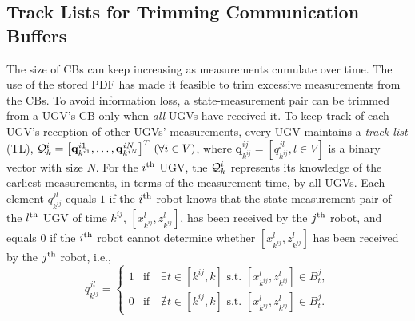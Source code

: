 	
	
	\subsection{Track Lists for Trimming Communication Buffers}\label{subsec:tracklist}
	The size of CBs can keep increasing as measurements cumulate over time. 
	The use of the stored PDF has made it feasible to trim excessive measurements from the CBs.
	To avoid information loss, a state-measurement pair can be trimmed from a UGV's CB only when \textit{all} UGVs have received it.
	To keep track of each UGV's reception of other UGVs' measurements, every UGV maintains a \textit{track list} (TL), $\mathcal{Q}^i_k=\left[\mathbf{q}^{i1}_{k^{i1}},\dots, \mathbf{q}^{iN}_{k^{iN}}\right]^T \,(\forall i\in V)$, where $\mathbf{q}^{ij}_{k^{ij}}=\left[q^{jl}_{k^{ij}}, l\in V\right]$ is a binary vector with size $N$.
	For the $i^\text{th}$ UGV, the $\mathcal{Q}^i_k$ represents its knowledge of the earliest measurements, in terms of the measurement time, by all UGVs.	
	Each element $q^{jl}_{k^{ij}}$ equals $1$ if the $i^\text{th}$ robot knows that the state-measurement pair of the $l^\text{th}$ UGV of time $k^{ij}$, $\left[x^l_{k^{ij}},z^l_{k^{ij}}\right]$, has been received by the $j^\text{th}$ robot, and equals $0$ if the $i^\text{th}$ robot cannot determine whether $\left[x^l_{k^{ij}},z^l_{k^{ij}}\right]$ has been received by the $j^\text{th}$ robot, i.e.,
	\begin{equation*}
	q^{jl}_{k^{ij}}=
	\begin{cases}
	1 & \text{if}\quad \exists t\in\left[k^{ij}, k\right] \text{ s.t. } \left[x^l_{k^{ij}},z^l_{k^{ij}}\right]\in B^j_t,\\
	0 & \text{if}\quad \nexists t\in\left[k^{ij}, k\right] \text{ s.t. } \left[x^l_{k^{ij}},z^l_{k^{ij}}\right]\in B^j_t.
	\end{cases}
	\end{equation*}
